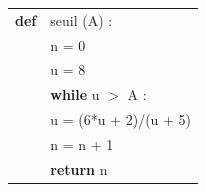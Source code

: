 \begin{minipage}{0.43\linewidth}
\begin{center}
\begin{tabular}{|l l|}\hline
\textbf{def}&seuil (A) :\\
&n = 0\\
&u = 8\\
&\textbf{while} u $>$ A :\\
&\qquad u = (6*u + 2)/(u + 5)\\
&\qquad n = n + 1\\
&\textbf{return} n\\ \hline
\end{tabular}
\end{center}
\end{minipage}

\bigskip
